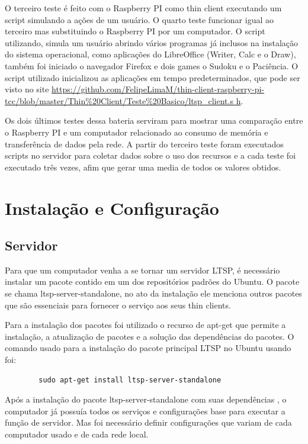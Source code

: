 \documentclass[
	12pt,				%
	openright,			%
	twoside,			%
	a4paper,			%
	chapter=TITLE,		%
	english,			%
	brazil				%
	]{abntex2}
\begin{document}
O terceiro teste é feito com o Raspberry PI como thin client executando um script simulando a ações de um usuário. O quarto teste funcionar igual ao terceiro mas substituindo o  Raspberry PI por um computador. O script utilizando, simula um usuário abrindo vários programas já inclusos na instalação do sistema operacional, como aplicações do LibreOffice (Writer, Calc e o Draw), também foi iniciado o navegador Firefox e dois games o Sudoku e o Paciência. O script utilizado inicializou as aplicações em tempo predeterminados, que pode ser visto no site \url{https://github.com/FelipeLimaM/thin-client-raspberry-pi-tcc/blob/master/Thin\%20Client/Teste\%20Basico/ltsp_client.s
h}.

Os dois últimos testes dessa bateria serviram para mostrar uma comparação entre o Raspberry PI e um computador relacionado ao consumo de memória e transferência de dados pela rede. A partir do terceiro teste foram executados scripts no servidor para coletar dados sobre o uso dos recursos e a cada teste foi executado três vezes, afim que gerar uma media de todos os valores obtidos. 



\part{Instalação e Configuração}

\chapter{Servidor}

Para que um computador venha a se tornar um servidor LTSP, é necessário instalar um pacote contido em um dos repositórios padrões do Ubuntu. O pacote se chama  ltsp-server-standalone, no ato da instalação ele menciona outros pacotes que são  essenciais para fornecer o serviço aos seus thin clients.

Para a instalação dos pacotes foi utilizado o recurso de apt-get que permite a instalação, a atualização de pacotes e a solução das dependências do pacotes\cite{apt_get}. O comando usado para a instalação do pacote principal LTSP no Ubuntu usando foi:


\begin{verbatim}
		sudo apt-get install ltsp-server-standalone
\end{verbatim}


Após a instalação do pacote ltsp-server-standalone com suas dependências , o computador já possuía todos os serviços e configurações base para executar a função de servidor. Mas foi necessário definir configurações que variam de cada computador usado e de cada rede local. 
\end{document}
